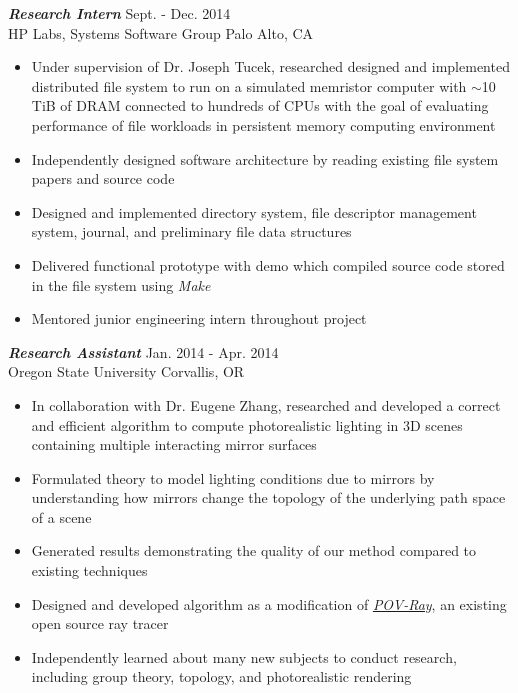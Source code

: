 \documentclass[line,10pt]{res}
\newcommand{\resumetitlemar}{0.5em}
\begin{document}
\begin{resume}
{\sl \textbf{Research Intern}} \hfill Sept. - Dec. 2014 \\
HP Labs, Systems Software Group \hfill Palo Alto, CA\null
\vspace{\resumetitlemar}
\begin{itemize}  \itemsep -2pt
\item Under supervision of Dr. Joseph Tucek, researched designed and implemented distributed file system to run on a simulated memristor computer with $\sim$10 TiB of DRAM connected to hundreds of CPUs with the goal of evaluating performance of file workloads in persistent memory computing environment
\item Independently designed software architecture by reading existing file system papers and source code
\item Designed and implemented directory system, file descriptor management system, journal, and preliminary file data structures
\item Delivered functional prototype with demo which compiled source code stored in the file system using \textit{Make}
\item Mentored junior engineering intern throughout project
\end{itemize}

\pagebreak

{\sl \textbf{Research Assistant}} \hfill Jan. 2014 - Apr. 2014\null\\
Oregon State University \hfill Corvallis, OR\null
\vspace{\resumetitlemar}
\begin{itemize}  \itemsep -2pt
\item In collaboration with Dr. Eugene Zhang, researched and developed a correct and efficient algorithm to compute photorealistic lighting in 3D scenes containing multiple interacting mirror surfaces
\item Formulated theory to model lighting conditions due to mirrors by understanding how mirrors change the topology of the underlying path space of a scene
\item Generated results demonstrating the quality of our method compared to existing techniques
\item Designed and developed algorithm as a modification of \href{http://www.povray.org}{\textit{POV-Ray}}, an existing open source ray tracer
\item Independently learned about many new subjects to conduct research, including group theory, topology, and photorealistic rendering
\end{itemize}


\end{resume}
\end{document}
